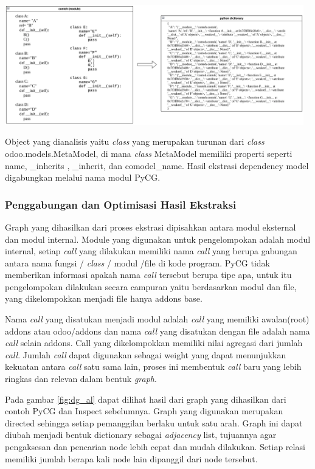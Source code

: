 \begin{center}
	\includegraphics[width=13cm]{img/bab_3/inspectSample.png}
	\label{contoh_inspectSample}
\end{center}

Object yang dianalisis yaitu \textit{class} yang merupakan turunan dari \textit{class} odoo.models.MetaModel, di mana \textit{class} MetaModel memiliki properti seperti  name, \_inherits , \_inherit, dan comodel\_name. Hasil ekstrasi dependency model digabungkan melalui nama modul PyCG.

\subsubsection{Penggabungan dan Optimisasi Hasil Ekstraksi}
Graph yang dihasilkan dari proses ekstrasi dipisahkan antara modul eksternal dan modul internal. Module yang digunakan untuk pengelompokan adalah modul internal, setiap \textit{call} yang dilakukan memiliki nama \textit{call} yang berupa gabungan antara nama fungsi / \textit{class} / modul /file di kode program. PyCG tidak memberikan informasi apakah nama \textit{call} tersebut berupa tipe apa, untuk itu pengelompokan dilakukan secara campuran yaitu berdasarkan modul dan file, yang dikelompokkan menjadi file hanya addons base.

Nama \textit{call} yang disatukan menjadi modul adalah \textit{call} yang memiliki awalan(root) addons atau odoo/addons dan nama \textit{call} yang disatukan dengan file adalah nama \textit{call} selain addons. Call yang dikelompokkan memiliki nilai agregasi dari jumlah \textit{call}. Jumlah \textit{call} dapat digunakan sebagai weight yang dapat menunjukkan kekuatan antara \textit{call} satu sama lain, proses ini membentuk \textit{call} baru yang lebih ringkas dan relevan dalam bentuk \textit{graph}. 

Pada gambar \ref{fig:dg_al} dapat dilihat hasil dari graph yang dihasilkan dari contoh PyCG dan Inspect sebelumnya. Graph yang digunakan merupakan directed sehingga setiap pemanggilan berlaku untuk satu arah. Graph ini dapat diubah menjadi bentuk dictionary sebagai \textit{adjacency} list, tujuannya agar pengaksesan dan pencarian node lebih cepat dan mudah dilakukan. Setiap relasi memiliki jumlah berapa kali node lain dipanggil dari node tersebut.

